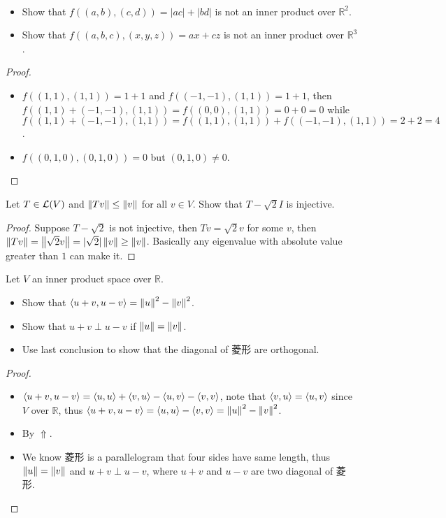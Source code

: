 \documentclass[../main.tex]{subfiles}
\begin{document}
\begin{exercise}
  ~
  \begin{itemize}
    \item Show that $f((a, b), (c, d)) = |ac| + |bd|$ is not an inner product over $\mathbb{R}^2$.
    \item Show that $f((a, b, c), (x, y, z)) = ax + cz$ is not an inner product over $\mathbb{R}^3$.
  \end{itemize}
\end{exercise}
\begin{proof}
  ~
  \begin{itemize}
    \item $f((1, 1), (1, 1)) = 1 + 1$ and $f((-1, -1), (1, 1)) = 1 + 1$, then $f((1, 1) + (-1, -1), (1, 1)) = f((0, 0), (1, 1)) = 0 + 0 = 0$
          while $f((1, 1) + (-1, -1), (1, 1)) = f((1, 1), (1, 1)) + f((-1, -1), (1, 1)) = 2 + 2 = 4$.
    \item $f((0, 1, 0), (0, 1, 0)) = 0$ but $(0, 1, 0) \neq 0$.
  \end{itemize}
\end{proof}

\begin{exercise}
  Let $T \in \mathcal{L}(V)$ and $\left\Vert Tv \right\Vert \le \left\Vert v \right\Vert$ for all $v \in V$.
  Show that $T - \sqrt{2}I$ is injective.
\end{exercise}
\begin{proof}
  Suppose $T - \sqrt{2}$ is not injective, then $Tv = \sqrt{2}v$ for some $v$,
  then $\left\Vert Tv \right\Vert = \left\Vert \sqrt{2}v \right\Vert = |\sqrt{2}|\left\Vert v \right\Vert \ge \left\Vert v \right\Vert$.
  Basically any eigenvalue with absolute value greater than $1$ can make it.
\end{proof}

\begin{exercise}
  Let $V$ an inner product space over $\mathbb{R}$.
  \begin{itemize}
    \item Show that $\langle u + v , u - v\rangle = \left\Vert u \right\Vert^2 - \left\Vert v \right\Vert^2$.
    \item Show that $u + v \perp u - v$ if $\left\Vert u \right\Vert = \left\Vert v \right\Vert$.
    \item Use last conclusion to show that the diagonal of 菱形 are orthogonal.
  \end{itemize}
\end{exercise}
\begin{proof}
  ~
  \begin{itemize}
    \item $\langle u + v , u - v\rangle = \langle u , u\rangle + \langle v , u\rangle - \langle u , v\rangle - \langle v , v\rangle$,
          note that $\langle v , u\rangle = \langle u , v\rangle$ since $V$ over $\mathbb{R}$,
          thus $\langle u + v , u - v\rangle = \langle u , u\rangle - \langle v , v\rangle = \left\Vert u \right\Vert^2 - \left\Vert v \right\Vert^2$.
    \item By $\Uparrow$.
    \item We know 菱形 is a parallelogram that four sides have same length,
          thus $\left\Vert u \right\Vert = \left\Vert v \right\Vert$ and $u + v \perp u - v$, where $u + v$ and $u - v$
          are two diagonal of 菱形.
  \end{itemize}
\end{proof}
\end{document}
